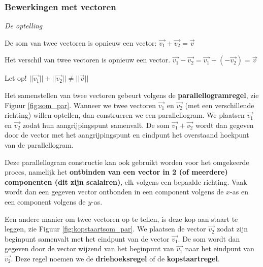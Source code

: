 \subsubsection{Bewerkingen met vectoren}

\emph{De optelling}

\begin{definitie}
De som van twee vectoren is opnieuw een vector: $\vec{v_1}+\vec{v_2}=\vec{v}$

Het verschil van twee vectoren is opnieuw een vector. $\vec{v_1}-\vec{v_2}=\vec{v_1}+(-\vec{v_2})=\vec{v}$
\end{definitie}

\begin{opmerking}
	Let op! $||\vec{v_1}||+||\vec{v_2}|| \ne ||\vec{v}||$
\end{opmerking}

Het samenstellen van twee vectoren gebeurt volgens de \textbf{parallellogramregel}, zie Figuur \ref{fig:som_par}. Wanneer we twee vectoren $\vec{v_1}$ en $\vec{v_2}$ (met een verschillende richting) willen optellen, dan construeren we een parallellogram. We plaatsen $\vec{v_1}$ en $\vec{v_2}$ zodat hun aangrijpingspunt samenvalt. De som $\vec{v_1}+\vec{v_2}$ wordt dan gegeven door de vector met het aangrijpingspunt en eindpunt het overstaand hoekpunt van de parallellogram.

Deze parallellogram constructie kan ook gebruikt worden voor het omgekeerde proces, namelijk het \textbf{ontbinden van een vector in 2 (of meerdere) componenten (dit zijn scalairen)}, elk volgens een bepaalde richting. Vaak wordt dan een gegeven vector ontbonden in een component volgens de $x$-as en een component volgens de $y$-as.

Een andere manier om twee vectoren op te tellen, is deze kop aan staart te leggen, zie Figuur \ref{fig:kopstaartsom_par}. We plaatsen de vector $\vec{v_2}$ zodat zijn beginpunt samenvalt met het eindpunt van de vector $\vec{v_1}$. De som  wordt dan gegeven door de vector wijzend van het beginpunt van $\vec{v_1}$ naar het eindpunt van $\vec{v_2}$. Deze regel noemen we de \textbf{driehoeksregel} of de \textbf{kopstaartregel}.


